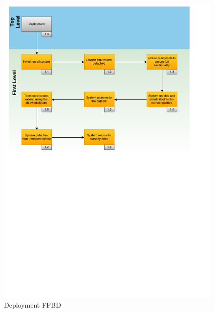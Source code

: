 \begin{figure}[H]
\centering
\includegraphics[width=\textwidth, height=0.94\textheight, keepaspectratio]{Figures/FFBD_deploy}
\caption{Deployment \acrshort{FFBD}}
\label{fig:FFBD_deploy}
\end{figure}


